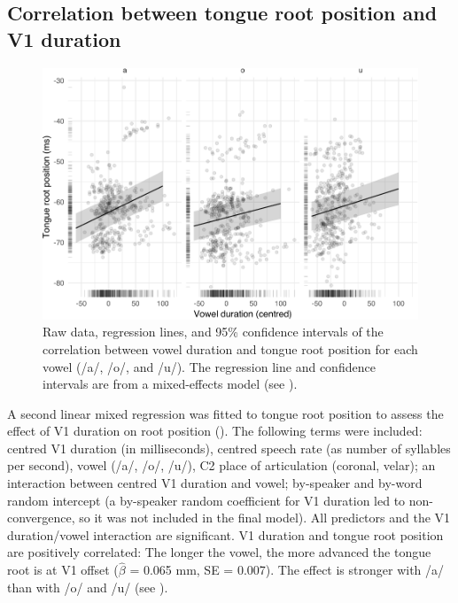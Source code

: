 \documentclass[
  12pt,
]{article}
\begin{document}
\hypertarget{correlation-between-tongue-root-position-and-v1-duration}{%
\subsection{Correlation between tongue root position and V1
duration}\label{correlation-between-tongue-root-position-and-v1-duration}}

\label{s:trp-vdur}

\begin{figure}
\includegraphics[width=\linewidth]{2018-tra_files/figure-latex/tra-lm-2-plot-1} \caption{Raw data, regression lines, and 95\% confidence intervals of the correlation between vowel duration and tongue root position for each vowel (/a/, /o/, and /u/). The regression line and confidence intervals are from a mixed-effects model (see ).}\label{f:tra-lm-2-plot}
\end{figure}

A second linear mixed regression was fitted to tongue root position to
assess the effect of V1 duration on root position
(). The following terms were included: centred
V1 duration (in milliseconds), centred speech rate (as number of
syllables per second), vowel (/a/, /o/, /u/), C2 place of articulation
(coronal, velar); an interaction between centred V1 duration and vowel;
by-speaker and by-word random intercept (a by-speaker random coefficient
for V1 duration led to non-convergence, so it was not included in the
final model). All predictors and the V1 duration/vowel interaction are
significant. V1 duration and tongue root position are positively
correlated: The longer the vowel, the more advanced the tongue root is
at V1 offset (\(\hat{\beta}\) = 0.065 mm, SE = 0.007). The effect is
stronger with /a/ than with /o/ and /u/ (see ).
\end{document}
